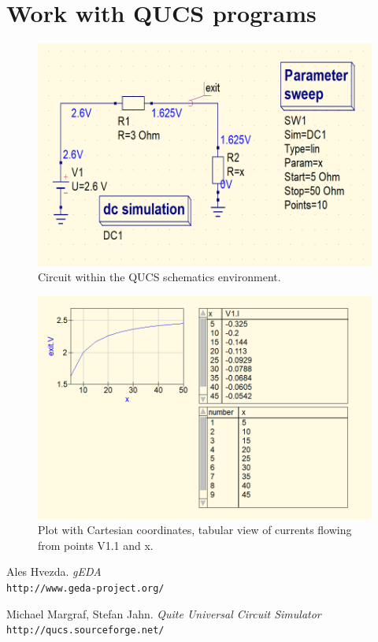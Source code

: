 \documentclass{report}
\begin{document}
\newpage

\section{Work with QUCS programs}
\begin{figure}[!ht]
\centering
\includegraphics[width=.9\linewidth]{qucs_1}
\caption{Circuit within the QUCS schematics environment. {\cite{qucs}}}
\end{figure}
\vspace*{\floatsep}
\begin{figure}[!hb]
\centering
\includegraphics[width=.9\linewidth]{qucs_2}
\caption{Plot with Cartesian coordinates, tabular view of currents flowing from points V1.1 and x.}
\label{i:qucs}
\end{figure}

\begin{thebibliography}{9}
Ales Hvezda. 
\textit{gEDA}
\\\texttt{http://www.geda-project.org/}

Michael Margraf, Stefan Jahn.  
\textit{Quite Universal Circuit Simulator}
\\\texttt{http://qucs.sourceforge.net/}

\end{thebibliography}
\end{document}
